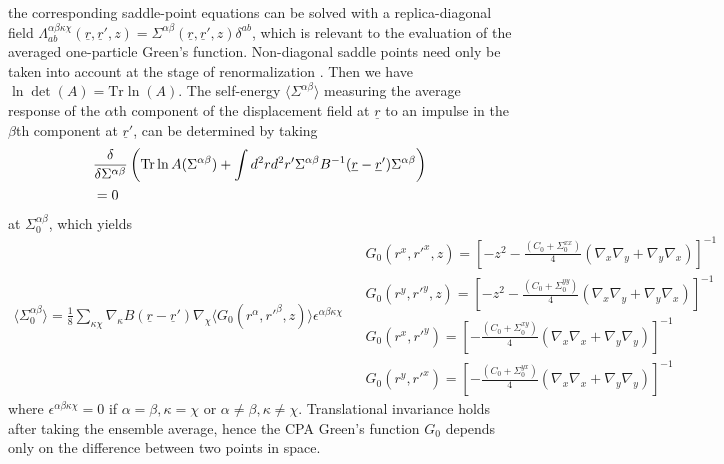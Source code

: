 \documentclass[twoside,twocolumn,9pt]{article}
\begin{document}
the corresponding saddle-point equations can be solved with a replica-diagonal field $\Lambda_{ab}^{\alpha\beta\kappa\chi}(\underline{r},\underline{r}',z)=\Sigma^{\alpha\beta}(\underline{r},\underline{r}',z)\delta^{ab}$, which is relevant to the evaluation of the averaged one-particle Green's function. Non-diagonal saddle points need only be taken into account at the stage of renormalization \cite{Mckane1981}. Then we have $\ln\det(A)=\text{Tr}\ln(A)$. The self-energy $\langle\Sigma^{\alpha\beta}\rangle$ measuring the average response of the $\alpha$th component of the displacement field at $\underline{r}$ to an impulse in the $\beta$th component at $\underline{r}'$, can be determined by taking
\begin{align}
&\frac{\delta}{\delta\Sigma^{\alpha\beta}}\left(\text{Tr}\ln A(\Sigma^{\alpha\beta})+\int d^2rd^2r'\Sigma^{\alpha\beta} B^{-1}(\underline{r}-\underline{r}')\Sigma^{\alpha\beta}\right)\notag\\
&=0
\end{align}
at $\Sigma_0^{\alpha\beta}$, which yields
\begin{subequations}
\begin{align}
\langle\Sigma_0^{\alpha\beta}\rangle=\frac{1}{8}\sum_{\kappa\chi}\nabla_\kappa B(\underline{r}-\underline{r}')\nabla_\chi \langle G_0(r^\alpha,r'^\beta,z)\rangle\epsilon^{\alpha\beta\kappa\chi}
\end{align}
\begin{align}
&G_0(r^x,r'^x,z)=\left[-z^2-\frac{(C_0+\Sigma^{xx}_0)}{4}(\nabla_x\nabla_y+\nabla_y\nabla_x)\right]^{-1}\\
&G_0(r^y,r'^y,z)=\left[-z^2-\frac{(C_0+\Sigma^{yy}_0)}{4}(\nabla_x\nabla_y+\nabla_y\nabla_x)\right]^{-1}\\
&G_0(r^x,r'^y)=\left[-\frac{(C_0+\Sigma^{xy}_0)}{4}(\nabla_x\nabla_x+\nabla_y\nabla_y)\right]^{-1}\\
&G_0(r^y,r'^x)=\left[-\frac{(C_0+\Sigma^{yx}_0)}{4}(\nabla_x\nabla_x+\nabla_y\nabla_y)\right]^{-1}
\end{align}
\end{subequations}
where $\epsilon^{\alpha\beta\kappa\chi}=0$ if $\alpha=\beta,\kappa=\chi$ or $\alpha\neq\beta, \kappa\neq\chi$. Translational invariance holds after taking the ensemble average, hence the CPA Green's function $G_0$ depends only on the difference between two points in space.
\end{document}
